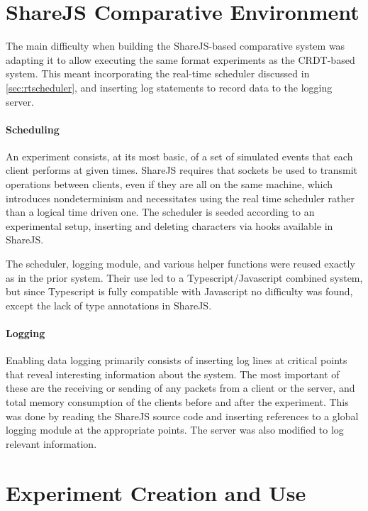 \documentclass[12pt,a4paper,twoside,openright]{report}
\begin{document}
	
	
\section{ShareJS Comparative Environment} \label{sec:comparative}

	The main difficulty when building the ShareJS-based comparative system was adapting it to allow executing the same format experiments as the CRDT-based system. This meant incorporating the real-time scheduler discussed in \cref{sec:rtscheduler}, and inserting log statements to record data to the logging server.
	
	\paragraph{Scheduling}
	An experiment consists, at its most basic, of a set of simulated events that each client performs at given times. ShareJS requires that sockets be used to transmit operations between clients, even if they are all on the same machine, which introduces nondeterminism and necessitates using the real time scheduler rather than a logical time driven one. The scheduler is seeded according to an experimental setup, inserting and deleting characters via hooks available in ShareJS. 
	
	The scheduler, logging module, and various helper functions were reused exactly as in the prior system. Their use led to a Typescript/Javascript combined system, but since Typescript is fully compatible with Javascript no difficulty was found, except the lack of type annotations in ShareJS.
	
	\paragraph{Logging}
	Enabling data logging primarily consists of inserting log lines at critical points that reveal interesting information about the system. The most important of these are the receiving or sending of any packets from a client or the server, and total memory consumption of the clients before and after the experiment. This was done by reading the ShareJS source code and inserting references to a global logging module at the appropriate points. The server was also modified to log relevant information.
	
\section{Experiment Creation and Use} \label{sec:experimentcreation}
\end{document}
